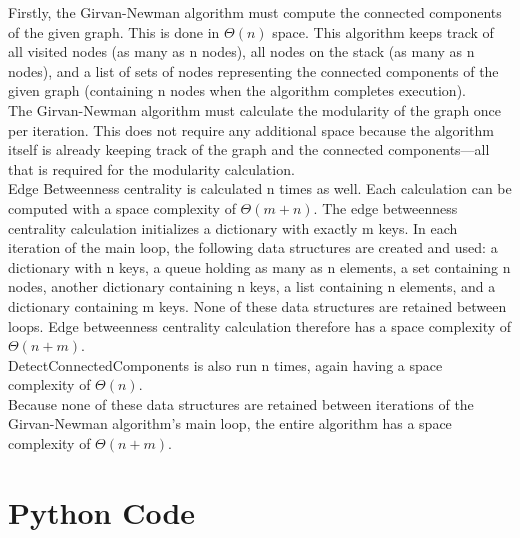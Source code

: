 \documentclass{article}
\begin{document}
Firstly, the Girvan-Newman algorithm must compute the connected components of the given graph.  This is done in $\Theta(n)$ space.  This algorithm keeps track of all visited nodes (as many as n nodes), all nodes on the stack (as many as n nodes), and a list of sets of nodes representing the connected components of the given graph (containing n nodes when the algorithm completes execution). \\

The Girvan-Newman algorithm must calculate the modularity of the graph once per iteration.  This does not require any additional space because the algorithm itself is already keeping track of the graph and the connected components---all that is required for the modularity calculation. \\

Edge Betweenness centrality is calculated n times as well.  Each calculation can be computed with a space complexity of $\Theta(m + n)$.  The edge betweenness centrality calculation initializes a dictionary with exactly m keys.  In each iteration of the main loop, the following data structures are created and used: a dictionary with n keys, a queue holding as many as n elements, a set containing n nodes, another dictionary containing n keys, a list containing n elements, and a dictionary containing m keys.  None of these data structures are retained between loops.  Edge betweenness centrality calculation therefore has a space complexity of $\Theta(n + m)$. \\

DetectConnectedComponents is also run n times, again having a space complexity of $\Theta(n)$. \\

Because none of these data structures are retained between iterations of the Girvan-Newman algorithm's main loop, the entire algorithm has a space complexity of $\Theta(n + m)$. \\

\section{Python Code}
\end{document}
